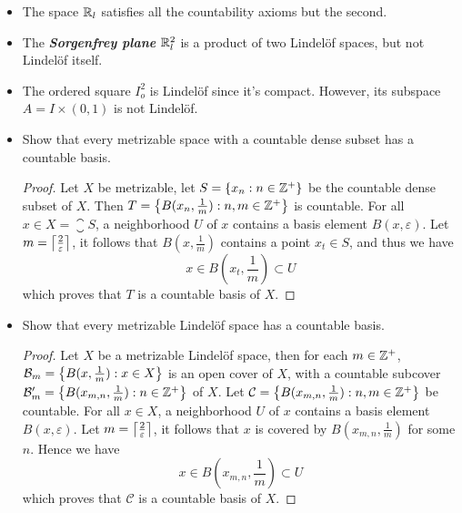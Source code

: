 \documentclass[12pt,a4paper]{article}
\begin{document}
    \begin{eg}\hfill
    
        \begin{itemize}
            \item The space $\mathbb{R}_l$ satisfies all the countability axioms but the second.
            \item The \textbf{\textit{Sorgenfrey plane}} $\mathbb{R}_l^2$ is a product of two Lindel\"of spaces, but not Lindel\"of itself.
            \item The ordered square $I_o^2$ is Lindel\"of since it's compact. However, its subspace $A=I\times(0,1)$ is not Lindel\"of.
        \end{itemize}        
    \end{eg}
    \hfill

    \begin{ex}\hfill\label{4.1.10}

        \begin{itemize}
            \item Show that every metrizable space with a countable dense subset has a countable basis.
            \begin{proof}
                Let $X$ be metrizable, let $S=\left\{x_n:n\in\mathbb{Z}^+\right\}$ be the countable dense subset of $X$. Then $T=\left\{B(x_n,\frac{1}{m}):n,m\in\mathbb{Z}^+\right\}$ is countable. For all $x\in X=\closure{S}$, a neighborhood $U$ of $x$ contains a basis element $B(x,\varepsilon)$. Let $m=\left\lceil \frac{2}{\varepsilon}\right\rceil$, it follows that $B(x,\frac{1}{m})$ contains a point $x_t\in S$, and thus we have
                $$
                x\in B\left(x_t,\frac{1}{m}\right)\subset U
                $$
                which proves that $T$ is a countable basis of $X$.
            \end{proof}
            \item Show that every metrizable Lindel\"of space has a countable basis.
            \begin{proof}
                Let $X$ be a metrizable Lindel\"of space, then for each $m\in\mathbb{Z}^+$, $\mathcal{B}_m=\left\{B(x,\frac{1}{m}):x\in X\right\}$ is an open cover of $X$, with a countable subcover $\mathcal{B}_m'=\left\{B(x_{m,n},\frac{1}{m}):n\in\mathbb{Z}^+\right\}$ of $X$. Let $\mathcal{C}=\left\{B(x_{m,n},\frac{1}{m}):n,m\in\mathbb{Z}^+\right\}$ be countable. For all $x\in X$, a neighborhood $U$ of $x$ contains a basis element $B(x,\varepsilon)$. Let $m=\left\lceil \frac{2}{\varepsilon}\right\rceil$, it follows that $x$ is covered by $B(x_{m,n},\frac{1}{m})$ for some $n$. Hence we have
                $$
                x\in B\left(x_{m,n},\frac{1}{m}\right)\subset U
                $$
                which proves that $\mathcal{C}$ is a countable basis of $X$.
            \end{proof}
        \end{itemize}
    \end{ex}
    \hfill
\end{document}
